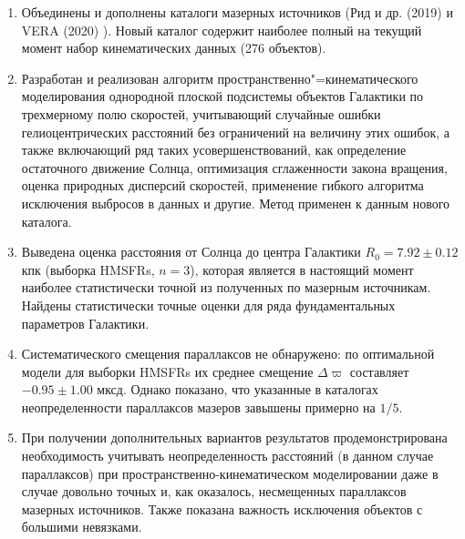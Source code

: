 \documentclass[a4paper, oneside, 14pt]{article}
\begin{document}
\begin{enumerate}
  \item Объединены и дополнены каталоги мазерных источников (Рид и др. (2019) \cite{R.2019} и VERA (2020) \cite{VERA.2020}). Новый каталог содержит наиболее полный на текущий момент набор кинематических данных (276 объектов).

  \item Разработан и реализован алгоритм пространственно"=кинематического моделирования однородной плоской подсистемы объектов Галактики по трехмерному полю скоростей, учитывающий случайные ошибки гелиоцентрических расстояний без ограничений на величину этих ошибок, а также включающий ряд таких усовершенствований, как определение остаточного движение Солнца, оптимизация сглаженности закона вращения, оценка природных дисперсий скоростей, применение гибкого алгоритма исключения выбросов в данных и другие. Метод применен к данным нового каталога.

  \item Выведена оценка расстояния от Солнца до центра Галактики $ R_0 = 7.92 \pm 0.12 $ кпк (выборка HMSFRs, $ n = 3 $), которая является в настоящий момент наиболее статистически точной из полученных по мазерным источникам. Найдены статистически точные оценки для ряда фундаментальных параметров Галактики.

  \item Систематического смещения параллаксов не обнаружено: по оптимальной модели для выборки HMSFRs их среднее смещение $ \Delta\varpi $ составляет $ -0.95 \pm 1.00 $ мксд. Однако показано, что указанные в каталогах неопределенности параллаксов мазеров завышены примерно на $ 1 / 5 $.

  \item При получении дополнительных вариантов результатов продемонстрирована необходимость учитывать неопределенность расстояний (в данном случае параллаксов) при пространственно-кинематическом моделировании даже в случае довольно точных и, как оказалось, несмещенных параллаксов мазерных источников. Также показана важность исключения объектов с большими невязками.
\end{enumerate}

\newpage

\printbibliography[heading=bibintoc]

\thispagestyle{empty}
\end{document}
